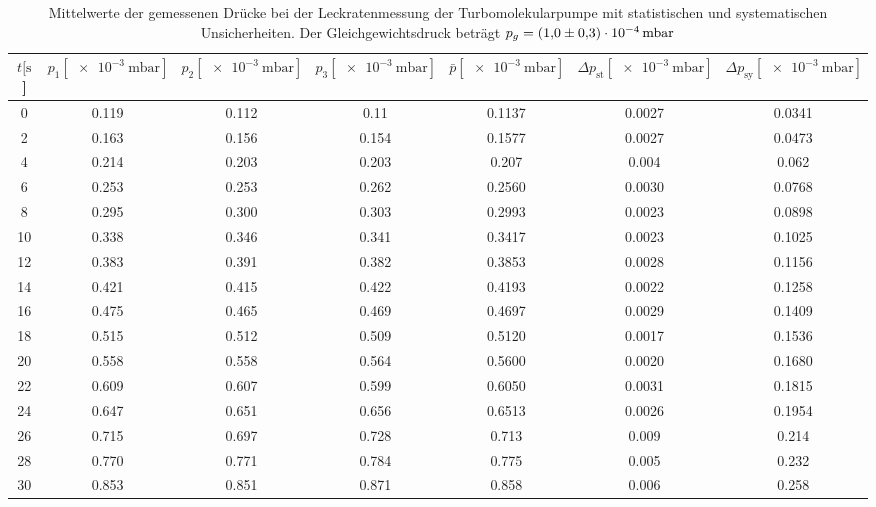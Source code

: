 \begin{table}[H]
  \centering
    \caption{Mittelwerte der gemessenen Drücke bei der Leckratenmessung der Turbomolekularpumpe mit statistischen und systematischen Unsicherheiten. Der Gleichgewichtsdruck beträgt $p_g=\SI{1.0 \pm 0.3 e-4}{\milli\bar}$}
    \label{tab:Turbo_Leck3}
    \small{
    \begin{tabular}{
      S[table-format=3.0] 
      S[table-format=1.3] S[table-format=1.3] S[table-format=1.3]
      S[table-format=1.4] S[table-format=1.4] S[table-format=1.3]
      }
      \toprule
      {$t [\si{\second}$]} &
      {$p_1 [\SI{e-3}{\milli\bar}]$} & {$p_2 [\SI{e-3}{\milli\bar}]$} & {$p_3 [\SI{e-3}{\milli\bar}]$} &
      {$\bar{p} [\SI{e-3}{\milli\bar}]$} & {$\Delta p_\text{st} [\SI{e-3}{\milli\bar}]$} & {$\Delta p_\text{sy} [\SI{e-3}{\milli\bar}]$}\\
           & 0.119 & 0.112 & 0.11  & 0.1137 & 0.0027 & 0.0341 \\
      2     & 0.163 & 0.156 & 0.154 & 0.1577 & 0.0027 & 0.0473 \\
      4     & 0.214 & 0.203 & 0.203 & 0.207  & 0.004  & 0.062  \\
      6     & 0.253 & 0.253 & 0.262 & 0.2560 & 0.0030 & 0.0768 \\
      8     & 0.295 & 0.300 & 0.303 & 0.2993 & 0.0023 & 0.0898 \\
      10    & 0.338 & 0.346 & 0.341 & 0.3417 & 0.0023 & 0.1025 \\
      12    & 0.383 & 0.391 & 0.382 & 0.3853 & 0.0028 & 0.1156 \\
      14    & 0.421 & 0.415 & 0.422 & 0.4193 & 0.0022 & 0.1258 \\
      16    & 0.475 & 0.465 & 0.469 & 0.4697 & 0.0029 & 0.1409 \\
      18    & 0.515 & 0.512 & 0.509 & 0.5120 & 0.0017 & 0.1536 \\
      20    & 0.558 & 0.558 & 0.564 & 0.5600 & 0.0020 & 0.1680 \\
      22    & 0.609 & 0.607 & 0.599 & 0.6050 & 0.0031 & 0.1815 \\
      24    & 0.647 & 0.651 & 0.656 & 0.6513 & 0.0026 & 0.1954 \\
      26    & 0.715 & 0.697 & 0.728 & 0.713  & 0.009  & 0.214  \\
      28    & 0.770 & 0.771 & 0.784 & 0.775  & 0.005  & 0.232  \\
      30    & 0.853 & 0.851 & 0.871 & 0.858  & 0.006  & 0.258  \\

\end{tabular}}
\end{table}
